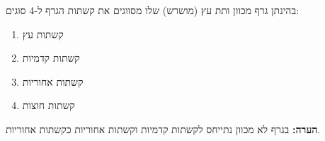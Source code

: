 בהינתן גרף מכוון ותת עץ (מושרש) שלו מסווגים את קשתות הגרף ל-4 סוגים:
\begin{enumerate}
\item
קשתות עץ
\item
קשתות קדמיות
\item
קשתות אחוריות
\item
קשתות חוצות
\end{enumerate}
\textbf{הערה:}
בגרף לא מכוון נתייחס לקשתות קדמיות וקשתות אחוריות כקשתות אחוריות.
